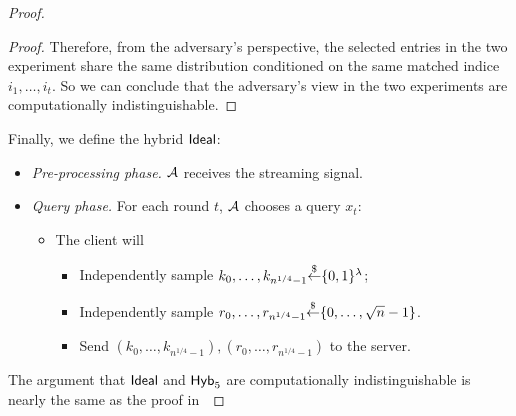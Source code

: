 \begin{proof}
\begin{proof}
        Therefore, from the adversary's perspective, the selected entries in the two experiment share the same distribution conditioned on the same matched indice $i_1,\dots,i_t$.
        So we can conclude that the adversary's view in the two experiments are computationally indistinguishable. 
    \end{proof}
    
    
    Finally, we define the hybrid ${\sf Ideal}$:
    
    \begin{itemize}
        \item \textit{Pre-processing phase.} $\mathcal{A}$ receives the streaming signal. 
        \item \textit{Query phase.} For each round $t$, $\mathcal{A}$ chooses a query $x_t$:
        \begin{itemize}
            \item The client will
            \begin{itemize}
                \item Independently sample $k_0,\dots,k_{n^{1/4}-1}{\overset{\$}{\leftarrow}}\{0,1\}^\lambda$;
                \item Independently sample $r_0,\dots,r_{n^{1/4}-1}{\overset{\$}{\leftarrow}}\{0,\dots,\sqrt{n}-1\}$.
                \item Send $(k_0,\dots,k_{n^{1/4}-1}),
                (r_0,\dots,r_{n^{1/4}-1})$ to the server.
            \end{itemize}
        \end{itemize}
    \end{itemize}
    
    The argument that ${\sf Ideal}$ and ${\sf Hyb}_5$ are computationally indistinguishable is nearly the same as the proof in~
\end{proof}

